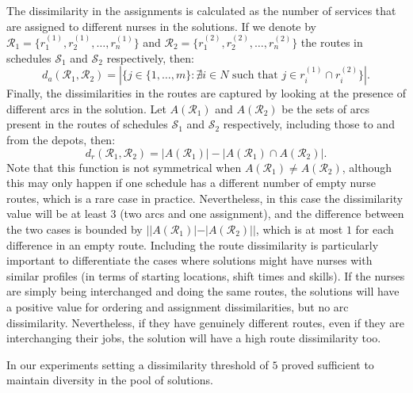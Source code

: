 \documentclass[a4paper,11pt,authoryear]{elsarticle}
\begin{document}
The dissimilarity in the assignments is calculated as the number of services that are assigned to different nurses in the solutions. If we denote by $\mathcal{R}_1 = \{
r^{(1)}_1, r^{(1)}_2, \dots, r^{(1)}_n\}$ and $\mathcal{R}_2 = \{r^{(2)}_1, r^{(2)}_2, \dots, r^{(2)}_n\}$ the routes in schedules $\mathcal{S}_1$ and $\mathcal{S}_2$ respectively, then:
\begin{equation}
    d_a(\mathcal{R}_1, \mathcal{R}_2) = |\{j\in\{1,\dots,m\} : \nexists i \in N \text{ such that } j \in r^{(1)}_i \cap r^{(2)}_i\}|. \label{eq:dissimilarityassignments}
\end{equation}
Finally, the dissimilarities in the routes are captured by looking at the presence of different arcs in the solution. Let $A(\mathcal{R}_1)$ and $A(\mathcal{R}_2)$ be the sets of arcs present in the routes of schedules $\mathcal{S}_1$ and $\mathcal{S}_2$ respectively, including those to and from the depots, then:
\begin{equation}
    d_r(\mathcal{R}_1, \mathcal{R}_2) = |A(\mathcal{R}_1)| - |A(\mathcal{R}_1) \cap A(\mathcal{R}_2)|. \label{eq:dissimilarityroutes}
\end{equation}
Note that this function is not symmetrical when $A(\mathcal{R}_1) \neq A(\mathcal{R}_2)$, although this may only happen if one schedule has a different number of empty nurse routes, which is a rare case in practice. Nevertheless, in this case the dissimilarity value will be at least $3$ (two arcs and one assignment), and the difference between the two cases is bounded by $||A(\mathcal{R}_1)| - |A(\mathcal{R}_2)||$, which is at most $1$ for each difference in an empty route. 
Including the route dissimilarity is particularly important to differentiate the cases where solutions might have nurses with similar profiles (in terms of starting locations, shift times and skills). If the nurses are simply being interchanged and doing the same routes, the solutions will have a positive value for ordering and assignment dissimilarities, but no arc dissimilarity. Nevertheless, if they have genuinely different routes, even if they are interchanging their jobs, the solution will have a high route dissimilarity too.

In our experiments setting a dissimilarity threshold of $5$ proved sufficient to maintain diversity in the pool of solutions.

\end{document}

